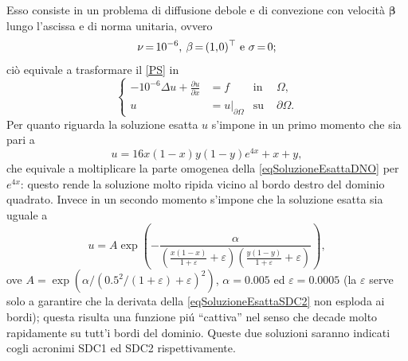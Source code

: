 \documentclass{article}
\newcommand{\derP}[2]{\frac{\partial#1}{\partial#2}}
\newcommand{\SpaziaturaMate}[3]{
    \setlength{\thinmuskip}{#1mu}
    \setlength{\medmuskip}{#2mu}
    \setlength{\thickmuskip}{#3mu}
}
\newcommand{\teqref}[2]{\hyperref[#1]{#2}}
\begin{document}
                Esso consiste in un problema di diffusione debole e di convezione con velocità $\boldsymbol\beta$ lungo l'ascissa e di norma unitaria, ovvero
                \begin{equation*}
                    \setlength{\abovedisplayskip}{5pt plus 2pt minus 2pt}  %
                    \setlength{\belowdisplayskip}{5pt plus 2pt minus 2pt}  %
                    \SpaziaturaMate{1}{2}{3}
                    \nu=10^{-6},\;\;\beta=(1,0)^{\top}\text{ e }\sigma=0;
                \end{equation*}
                ciò equivale a trasformare il \teqref{eqProblemaStazionario}{[PS]} in
                \begin{equation}
                    \left\{
                    \begin{aligned}
                        -10^{-6}\Delta u+\derP ux&=f&\text{in }&\Omega, \\
                        u&=u\vert_{\partial\Omega}&\text{su }&\partial\Omega.
                    \end{aligned}
                    \right.
                    \label{eqSDC}
                \end{equation}
                Per quanto riguarda la soluzione esatta $u$ s'impone in un primo momento che sia pari a
                \begin{equation}
                    u=16x(1-x)y(1-y)e^{4x}+x+y,
                    \label{eqSoluzioneEsattaSDC1}
                \end{equation}
                che equivale a moltiplicare la parte omogenea della \eqref{eqSoluzioneEsattaDNO} per $e^{4x}$: questo rende la soluzione molto ripida vicino al bordo destro del dominio quadrato. Invece in un secondo momento s'impone che la soluzione esatta sia uguale a
                \begin{equation}
                    u=A\exp\left(-\frac\alpha
                    {\left(\frac{x(1-x)}{1+\varepsilon}+\varepsilon\right)
                    \left(\frac{y(1-y)}{1+\varepsilon}+\varepsilon\right)}\right),
                    \label{eqSoluzioneEsattaSDC2}
                \end{equation}
                ove $A=\exp(\alpha/(0.5^2/(1+\varepsilon)+\varepsilon)^2)$, $\alpha=0.005$ ed $\varepsilon=0.0005$ (la $\varepsilon$ serve solo a garantire che la derivata della \eqref{eqSoluzioneEsattaSDC2} non esploda ai bordi); questa risulta una funzione piú ``cattiva'' nel senso che decade molto rapidamente su tutt'i bordi del dominio. Queste due soluzioni saranno indicati cogli acronimi SDC1 ed SDC2 rispettivamente.
\end{document}
